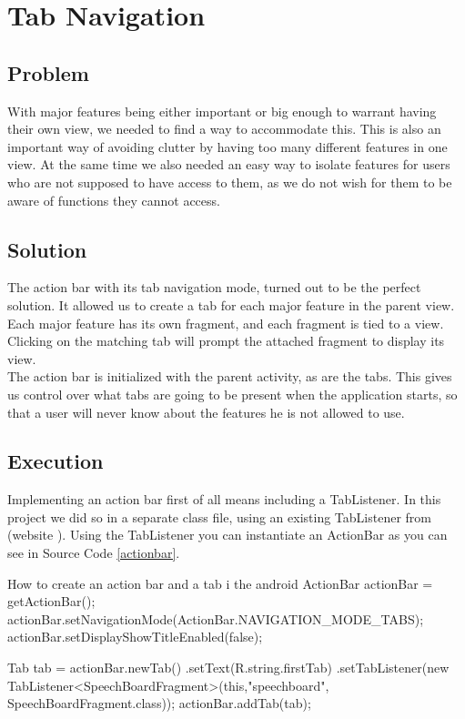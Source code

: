 \section{Tab Navigation} %
\subsection*{Problem}
With major features being either important or big enough to warrant having their own view, we needed to find a way to accommodate this.
This is also an important way of avoiding clutter by having too many different features in one view.
At the same time we also needed an easy way to isolate features for users who are not supposed to have access to them, as we do not wish for them to be aware of functions they cannot access.

\subsection*{Solution}
The action bar with its tab navigation mode, turned out to be the perfect solution. It allowed us to create a tab for each major feature in the parent view.
Each major feature has its own fragment, and each fragment is tied to a view. Clicking on the matching tab will prompt the attached fragment to display its view.\\
The action bar is initialized with the parent activity, as are the tabs.
This gives us control over what tabs are going to be present when the application starts, so that a user will never know about the features he is not allowed to use.

\subsection*{Execution}
Implementing an action bar first of all means including a TabListener.
In this project we did so in a separate class file, using an existing TabListener from (website \cite{actionbarguide}).
Using the TabListener you can instantiate an ActionBar as you can see in Source Code \ref{actionbar}.

\begin{source}[{actionbar}]{How to create an action bar and a tab i the android}
ActionBar actionBar = getActionBar();
actionBar.setNavigationMode(ActionBar.NAVIGATION_MODE_TABS); 
actionBar.setDisplayShowTitleEnabled(false);

Tab tab = actionBar.newTab()
		.setText(R.string.firstTab) 
		.setTabListener(new TabListener<SpeechBoardFragment>(this,"speechboard", SpeechBoardFragment.class));
actionBar.addTab(tab);
\end{source}

